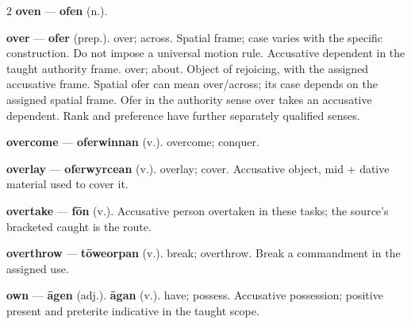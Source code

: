 \begin{multicols}{2}
\textbf{oven} — \textbf{ofen} (n.).\par
\textbf{over} — \textbf{ofer} (prep.). over; across. Spatial frame; case varies with the specific construction. Do not impose a universal motion rule. Accusative dependent in the taught authority frame. over; about. Object of rejoicing, with the assigned accusative frame. Spatial ofer can mean over/across; its case depends on the assigned spatial frame. Ofer in the authority sense over takes an accusative dependent. Rank and preference have further separately qualified senses.\par
\textbf{overcome} — \textbf{oferwinnan} (v.). overcome; conquer.\par
\textbf{overlay} — \textbf{oferwyrcean} (v.). overlay; cover. Accusative object, mid + dative material used to cover it.\par
\textbf{overtake} — \textbf{fōn} (v.). Accusative person overtaken in these tasks; the source's bracketed caught is the route.\par
\textbf{overthrow} — \textbf{tōweorpan} (v.). break; overthrow. Break a commandment in the assigned use.\par
\textbf{own} — \textbf{āgen} (adj.).  \textbf{āgan} (v.). have; possess. Accusative possession; positive present and preterite indicative in the taught scope.\par

\end{multicols}
